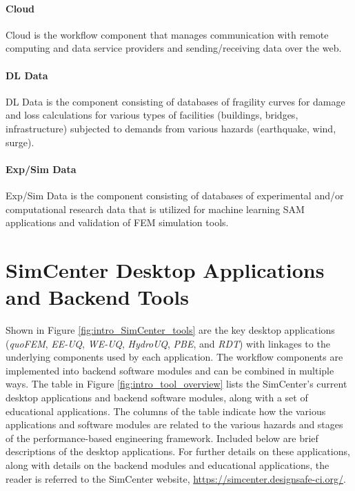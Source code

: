 \paragraph{Cloud} Cloud is the workflow component that manages communication with remote computing and data service providers and sending/receiving data over the web.

\paragraph{DL Data} DL Data is the component consisting of databases of fragility curves for damage and loss calculations for various types of facilities (buildings, bridges, infrastructure) subjected to demands from various hazards (earthquake, wind, surge).

\paragraph{Exp/Sim Data} Exp/Sim Data is the component consisting of databases of experimental and/or computational research data that is utilized for machine learning SAM applications and validation of FEM simulation tools.

\section{SimCenter Desktop Applications and Backend Tools}

Shown in Figure \ref{fig:intro_SimCenter_tools} are the key desktop applications (\emph{quoFEM}, \emph{EE-UQ}, \emph{WE-UQ}, \emph{HydroUQ}, \emph{PBE}, and \emph{RDT}) with linkages to the underlying components used by each application. The workflow components are implemented into backend software modules and can be combined in multiple ways.  The table in Figure \ref{fig:intro_tool_overview} lists the SimCenter’s current desktop applications and backend software modules, along with a set of educational applications.  The columns of the table indicate how the various applications and software modules are related to the various hazards and stages of the performance-based engineering framework. Included below are brief descriptions of the desktop applications.  For further details on these applications, along with details on the backend modules and educational applications, the reader is referred to the SimCenter website, \url{https://simcenter.designsafe-ci.org/}. 

